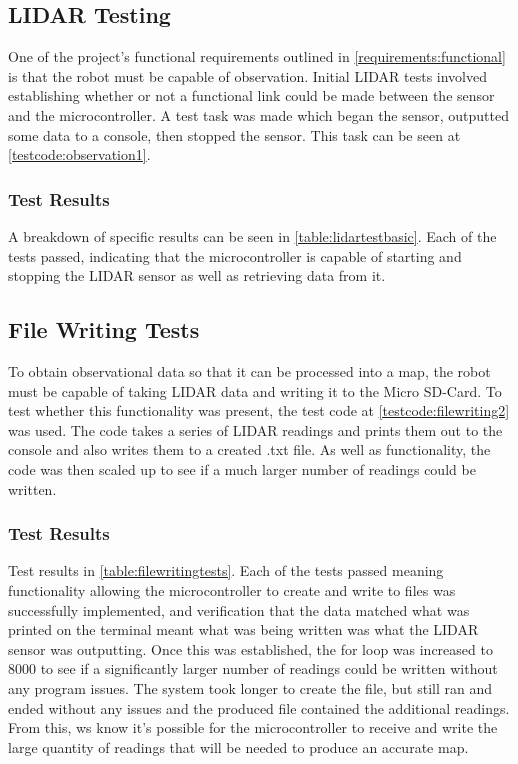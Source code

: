 			\subsection{LIDAR Testing}
			One of the project's functional requirements outlined in \ref{requirements:functional} is that the robot must be capable of observation. Initial LIDAR tests involved establishing whether or not a functional link could be made between the sensor and the microcontroller. A test task was made which began the sensor, outputted some data to a console, then stopped the sensor. This task can be seen at \ref{testcode:observation1}.
			
				\subsubsection{Test Results}
				A breakdown of specific results can be seen in \ref{table:lidartestbasic}. Each of the tests passed, indicating that the microcontroller is capable of starting and stopping the LIDAR sensor as well as retrieving data from it.
				
			\subsection{File Writing Tests}
			To obtain observational data so that it can be processed into a map, the robot must be capable of taking LIDAR data and writing it to the Micro SD-Card. To test whether this functionality was present, the test code at \ref{testcode:filewriting2} was used. The code takes a series of LIDAR readings and prints them out to the console and also writes them to a created .txt file. As well as functionality, the code was then scaled up to see if a much larger number of readings could be written.
				
				\subsubsection{Test Results}
				Test results in \ref{table:filewritingtests}. Each of the tests passed meaning functionality allowing the microcontroller to create and write to files was successfully implemented, and verification that the data matched what was printed on the terminal meant what was being written was what the LIDAR sensor was outputting. Once this was established, the for loop was increased to 8000 to see if a significantly larger number of readings could be written without any program issues. The system took longer to create the file, but still ran and ended without any issues and the produced file contained the additional readings. From this, ws know it's possible for the microcontroller to receive and write the large quantity of readings that will be needed to produce an accurate map.
				
